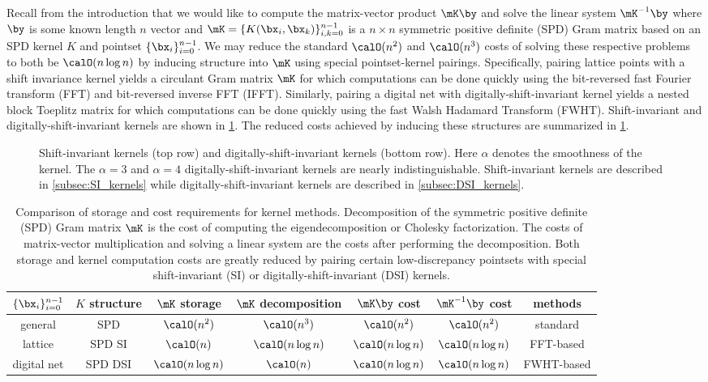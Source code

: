 \documentclass[acmsmall]{acmart}
\begin{document}
Recall from the introduction that we would like to compute the matrix-vector product $\mK \by$ and solve the linear system $\mK^{-1} \by$ where $\by$ is some known length $n$ vector and $\mK = \{K(\bx_i,\bx_k)\}_{i,k=0}^{n-1}$ is a $n \times n$ symmetric positive definite (SPD) Gram matrix based on an SPD kernel $K$ and pointset $\{\bx_i\}_{i=0}^{n-1}$. We may reduce the standard $\calO(n^2)$ and $\calO(n^3)$ costs of solving these respective problems to both be $\calO(n \log n)$ by inducing structure into $\mK$ using special pointset-kernel pairings. Specifically, pairing lattice points with a shift invariance kernel yields a circulant Gram matrix $\mK$ for which computations can be done quickly using the bit-reversed fast Fourier transform (FFT) and bit-reversed inverse FFT (IFFT). Similarly, pairing a digital net with digitally-shift-invariant kernel yields a nested block Toeplitz matrix for which computations can be done quickly using the fast Walsh Hadamard Transform (FWHT). Shift-invariant and digitally-shift-invariant kernels are shown in \cref{fig:SI_DSI_kernels}. The reduced costs achieved by inducing these structures are summarized in \cref{tab:com_kernel_costs}.

\begin{figure}%
    \centering
    \caption{Shift-invariant kernels (top row) and digitally-shift-invariant kernels (bottom row). Here $\alpha$ denotes the smoothness of the kernel. The $\alpha=3$ and $\alpha=4$ digitally-shift-invariant kernels are nearly indistinguishable. Shift-invariant kernels are described in \cref{subsec:SI_kernels} while digitally-shift-invariant kernels are described in \cref{subsec:DSI_kernels}.}
    \Description[]{}
    \label{fig:SI_DSI_kernels}
\end{figure}

\begin{table}[H]
    \centering
    \begin{tabular}{ccccccc} 
        $\{\bx_i\}_{i=0}^{n-1}$ & $K$ structure & $\mK$ storage & $\mK$ decomposition & $\mK \by$ cost & $\mK^{-1} \by$ cost & methods \\ 
        \hline 
        general & SPD & $\calO(n^2)$ & $\calO(n^3)$ & $\calO(n^2)$ & $\calO(n^2)$ & standard  \\
        lattice & SPD SI & $\calO(n)$ & $\calO(n \log n)$ & $\calO(n \log n)$ & $\calO(n \log n)$ & FFT-based \\ 
        digital net & SPD DSI & $\calO(n \log n)$ & $\calO(n)$ & $\calO(n \log n)$ & $\calO(n \log n)$ &FWHT-based
    \end{tabular}
    \caption{Comparison of storage and cost requirements for kernel methods. Decomposition of the symmetric positive definite (SPD) Gram matrix $\mK$ is the cost of computing the eigendecomposition or Cholesky factorization. The costs of matrix-vector multiplication and solving a linear system are the costs after performing the decomposition. Both storage and kernel computation costs are greatly reduced by pairing certain low-discrepancy pointsets with special shift-invariant (SI) or digitally-shift-invariant (DSI) kernels.}
    \label{tab:com_kernel_costs}
\end{table}
\end{document}
